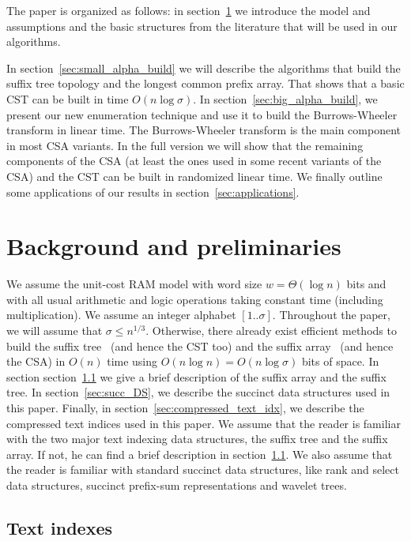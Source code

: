 \documentclass[a4paper]{article}
\begin{document}
The paper is organized as follows: in section~\ref{sec:back_prel}
we introduce the model and assumptions
and the basic structures from the literature 
that will be used in our algorithms. 

In section~\ref{sec:small_alpha_build} we will describe the algorithms 
that build the suffix tree topology and the longest common prefix array. 
That shows that a basic \textsc{CST} can be built in time $O(n\log\sigma)$. 
In section~\ref{sec:big_alpha_build}, we present our new enumeration technique
and use it to build the Burrows-Wheeler transform in linear time. The Burrows-Wheeler 
transform is the main component in most \textsc{CSA} variants. In the full 
version we will show that the remaining components of the \textsc{CSA}
(at least the ones used in some recent variants of the CSA) and the \textsc{CST}
can be built in randomized linear time. 
We finally outline some applications of our results in section~\ref{sec:applications}. 


\section{Background and preliminaries}
\label{sec:back_prel}
We assume the unit-cost RAM model with word size $w=\Theta(\log n)$ bits and with all usual arithmetic and logic
operations taking constant time (including multiplication). 
We assume an integer alphabet $[1..\sigma]$. Throughout the paper, we will assume that $\sigma\leq n^{1/3}$. Otherwise, there already exist efficient methods to build the suffix tree~\cite{Fa97} (and hence the \textsc{CST} too) and the suffix array~\cite{KA03,KSPP05,KSB06} (and hence the \textsc{CSA}) in $O(n)$ time using $O(n\log n)=O(n\log\sigma)$ bits of space. 
In section section~\ref{sec:text_indexes} we give a brief description of the suffix array and the suffix tree.
In section~\ref{sec:succ_DS}, we describe the succinct data structures used in this paper. Finally, in section~\ref{sec:compressed_text_idx}, we describe the compressed text indices used in this paper. 
We assume that the reader is familiar with the two major text indexing data structures, the suffix tree and the suffix array. If not, he can find a brief description in section~\ref{sec:text_indexes}. We also assume that the reader is familiar with standard succinct data structures, like rank and select data structures, succinct prefix-sum representations and wavelet trees. 
\subsection{Text indexes}
\label{sec:text_indexes}
\end{document}
